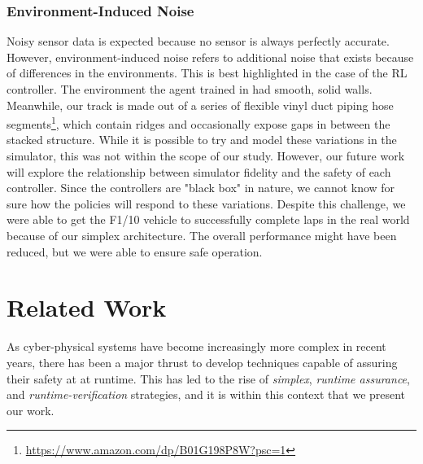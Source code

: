 \documentclass[manuscript,screen,review]{acmart}
\begin{document}
\subsubsection{Environment-Induced Noise} Noisy sensor data is expected because no sensor is always perfectly accurate. However, environment-induced noise refers to additional noise that exists because of differences in the environments. This is best highlighted in the case of the RL controller. The environment the agent trained in had smooth, solid walls. Meanwhile, our track is made out of a series of flexible vinyl duct piping hose segments\footnote{\url{https://www.amazon.com/dp/B01G198P8W?psc=1}}, which contain ridges and occasionally expose gaps in between the stacked structure.
While it is possible to try and model these variations in the simulator, this was not within the scope of our study. However, our future work will explore the relationship between simulator fidelity and the safety of each controller. Since the controllers are "black box" in nature, we cannot know for sure how the policies will respond to these variations. Despite this challenge, we were able to get the F1/10 vehicle to successfully complete laps in the real world because of our simplex architecture. The overall performance might have been reduced, but we were able to ensure safe operation.

\section{Related Work}

As cyber-physical systems have become increasingly more complex in recent years, there has been a major thrust to develop techniques capable of assuring their safety at at runtime. %
This has led to the rise of \textit{simplex}, \textit{runtime assurance}, and \textit{runtime-verification} strategies, and it is within this context that we present our work.
\end{document}
